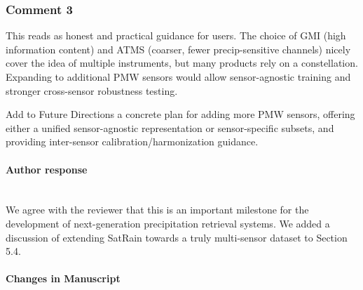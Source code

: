\begin{itemize}
\subsubsection*{Comment 3}

\rc

This reads as honest and practical guidance for users. The choice of GMI (high
information content) and ATMS (coarser, fewer precip-sensitive channels) nicely
cover the idea of multiple instruments, but many products rely on a
constellation. Expanding to additional PMW sensors would allow sensor-agnostic
training and stronger cross-sensor robustness testing.

Add to Future Directions a concrete plan for adding more PMW sensors, offering
either a unified sensor-agnostic representation or sensor-specific subsets, and
providing inter-sensor calibration/harmonization guidance.


\reply

\paragraph*{Author response} \\

We agree with the reviewer that this is an important milestone for the
development of next-generation precipitation retrieval systems. We added a
discussion of extending SatRain towards a truly multi-sensor dataset to Section 5.4.

\paragraph*{Changes in Manuscript} \\

\begin{change}[829]


\end{change}
\end{itemize}
